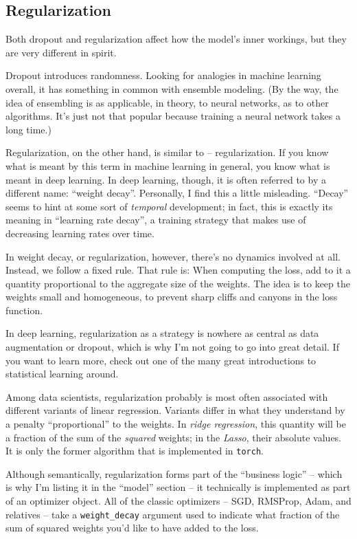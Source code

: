\documentclass[
  letterpaper,
]{krantz}
\begin{document}
\hypertarget{regularization}{%
\subsection{\texorpdfstring{Regularization}{Regularization}}\label{regularization}}

Both dropout and regularization affect how the model's inner workings,
but they are very different in spirit.

Dropout introduces randomness. Looking for analogies in machine learning
overall, it has something in common with ensemble modeling. (By the way,
the idea of ensembling is as applicable, in theory, to neural networks,
as to other algorithms. It's just not that popular because training a
neural network takes a long time.)

Regularization, on the other hand, is similar to -- regularization. If
you know what is meant by this term in machine learning in general, you
know what is meant in deep learning. In deep learning, though, it is
often referred to by a different name: ``weight decay''. Personally, I
find this a little misleading. ``Decay'' seems to hint at some sort of
\emph{temporal} development; in fact, this is exactly its meaning in
``learning rate decay'', a training strategy that makes use of
decreasing learning rates over time.

In weight decay, or regularization, however, there's no dynamics
involved at all. Instead, we follow a fixed rule. That rule is: When
computing the loss, add to it a quantity proportional to the aggregate
size of the weights. The idea is to keep the weights small and
homogeneous, to prevent sharp cliffs and canyons in the loss function.

In deep learning, regularization as a strategy is nowhere as central as
data augmentation or dropout, which is why I'm not going to go into
great detail. If you want to learn more, check out one of the many great
introductions to statistical learning around.

Among data scientists, regularization probably is most often associated
with different variants of linear regression. Variants differ in what
they understand by a penalty ``proportional'' to the weights. In
\emph{ridge regression}, this quantity will be a fraction of the sum of
the \emph{squared} weights; in the \emph{Lasso}, their absolute values.
It is only the former algorithm that is implemented in \texttt{torch}.

Although semantically, regularization forms part of the ``business
logic'' -- which is why I'm listing it in the ``model'' section -- it
technically is implemented as part of an optimizer object. All of the
classic optimizers -- SGD, RMSProp, Adam, and relatives -- take a
\texttt{weight\_decay} argument used to indicate what fraction of the
sum of squared weights you'd like to have added to the loss.
\end{document}
